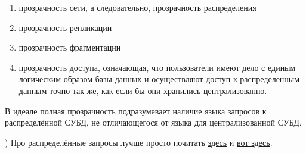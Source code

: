 \begin{enumerate}
	\item[\textbullet] прозрачность сети, а следовательно, прозрачность распределения
	\item[\textbullet] прозрачность репликации
	\item[\textbullet] прозрачность фрагментации
	\item[\textbullet] прозрачность доступа, означающая, что пользователи имеют дело с единым логическим образом базы данных и осуществляют доступ к распределенным данным точно так же, как если бы они хранились централизованно.
\end{enumerate}

В идеале полная прозрачность подразумевает наличие языка запросов к распределённой СУБД, не отличающегося от языка для централизованной СУБД.

) Про распределённые запросы лучше просто почитать \href{https://www.ibm.com/docs/ru/informix-servers/12.10?topic=SSGU8G_12.1.0/com.ibm.admin.doc/ids_admin_0069.htm}{здесь} и \href{https://studfile.net/preview/9032573/page:10/}{вот здесь}.
